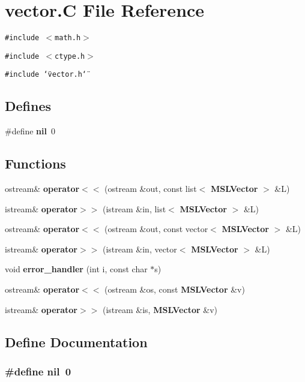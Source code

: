 \section{vector.C File Reference}
\label{vector_C}
{\tt \#include $<$math.h$>$}\par
{\tt \#include $<$ctype.h$>$}\par
{\tt \#include \char`\"{}vector.h\char`\"{}}\par
\subsection*{Defines}
\begin{CompactItemize}
\item 
\#define {\bf nil}\ 0
\end{CompactItemize}
\subsection*{Functions}
\begin{CompactItemize}
\item 
ostream\& {\bf operator$<$$<$} (ostream \&out, const list$<$ {\bf MSLVector} $>$ \&L)
\item 
istream\& {\bf operator$>$$>$} (istream \&in, list$<$ {\bf MSLVector} $>$ \&L)
\item 
ostream\& {\bf operator$<$$<$} (ostream \&out, const vector$<$ {\bf MSLVector} $>$ \&L)
\item 
istream\& {\bf operator$>$$>$} (istream \&in, vector$<$ {\bf MSLVector} $>$ \&L)
\item 
void {\bf error\_\-handler} (int i, const char $\ast$s)
\item 
ostream\& {\bf operator$<$$<$} (ostream \&os, const {\bf MSLVector} \&v)
\item 
istream\& {\bf operator$>$$>$} (istream \&is, {\bf MSLVector} \&v)
\end{CompactItemize}


\subsection{Define Documentation}
\subsubsection{\setlength{\rightskip}{0pt plus 5cm}\#define nil\ 0}\label{vector_C_a0}




